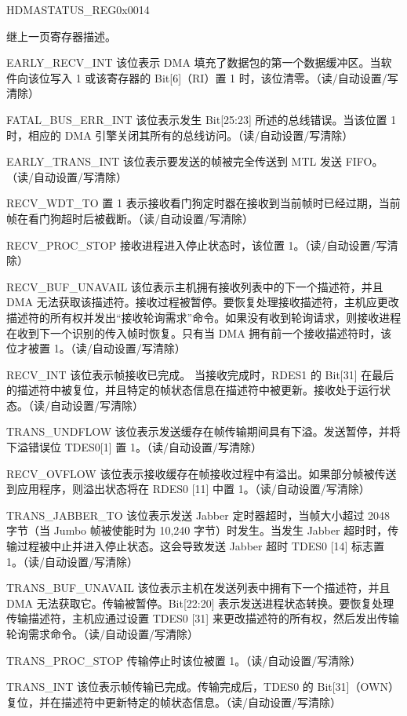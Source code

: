 \addtocounter{Regfloat}{-1}
\begin{register}{H}{DMASTATUS\_REG}{0x0014}
\begin{regdesc}\begin{reglist}\item [继上一页寄存器描述。]

\item [EARLY\_RECV\_INT]该位表示 DMA 填充了数据包的第一个数据缓冲区。当软件向该位写入 1 或该寄存器的 Bit[6]（RI）置 1 时，该位清零。（读/自动设置/写清除）
\item [FATAL\_BUS\_ERR\_INT]该位表示发生 Bit[25:23] 所述的总线错误。当该位置 1 时，相应的 DMA 引擎关闭其所有的总线访问。（读/自动设置/写清除）
\item [EARLY\_TRANS\_INT]该位表示要发送的帧被完全传送到 MTL 发送 FIFO。（读/自动设置/写清除）
\item [RECV\_WDT\_TO]置 1 表示接收看门狗定时器在接收到当前帧时已经过期，当前帧在看门狗超时后被截断。（读/自动设置/写清除）
\item [RECV\_PROC\_STOP]接收进程进入停止状态时，该位置 1。（读/自动设置/写清除）
\item [RECV\_BUF\_UNAVAIL] 该位表示主机拥有接收列表中的下一个描述符，并且 DMA 无法获取该描述符。接收过程被暂停。要恢复处理接收描述符，主机应更改描述符的所有权并发出“接收轮询需求”命令。如果没有收到轮询请求，则接收进程在收到下一个识别的传入帧时恢复。只有当 DMA 拥有前一个接收描述符时，该位才被置 1。（读/自动设置/写清除）
\item [RECV\_INT] 该位表示帧接收已完成。 当接收完成时，RDES1 的 Bit[31] 在最后的描述符中被复位，并且特定的帧状态信息在描述符中被更新。接收处于运行状态。（读/自动设置/写清除）
\item [TRANS\_UNDFLOW]该位表示发送缓存在帧传输期间具有下溢。发送暂停，并将下溢错误位 TDES0[1] 置 1。（读/自动设置/写清除）
\item [RECV\_OVFLOW]该位表示接收缓存在帧接收过程中有溢出。如果部分帧被传送到应用程序，则溢出状态将在 RDES0 [11] 中置 1。（读/自动设置/写清除）
\item [TRANS\_JABBER\_TO]该位表示发送 Jabber 定时器超时，当帧大小超过 2048 字节（当 Jumbo 帧被使能时为 10,240 字节）时发生。当发生 Jabber 超时时，传输过程被中止并进入停止状态。这会导致发送 Jabber 超时 TDES0 [14] 标志置 1。（读/自动设置/写清除）
\item [TRANS\_BUF\_UNAVAIL] 该位表示主机在发送列表中拥有下一个描述符，并且 DMA 无法获取它。传输被暂停。Bit[22:20] 表示发送进程状态转换。要恢复处理传输描述符，主机应通过设置 TDES0 [31] 来更改描述符的所有权，然后发出传输轮询需求命令。（读/自动设置/写清除）
\item [TRANS\_PROC\_STOP]传输停止时该位被置 1。（读/自动设置/写清除）
\item [TRANS\_INT]该位表示帧传输已完成。传输完成后，TDES0 的 Bit[31]（OWN）复位，并在描述符中更新特定的帧状态信息。（读/自动设置/写清除）
\end{reglist}\end{regdesc}
\end{register}


